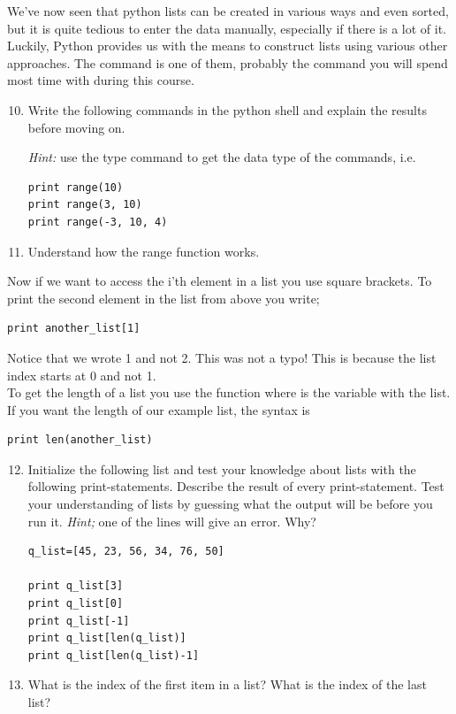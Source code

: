 \documentclass{article}
\begin{document}
We've now seen that python lists can be created in various ways and even
sorted, but it is quite tedious to enter the data manually, especially if
there is a lot of it.
Luckily, Python provides us with the means to construct
lists using various other approaches.
The  command is one of them, probably the
command you will spend most time with during this course.

\begin{enumerate}
  \setcounter{enumi}{9}
  \item Write the following commands in the python shell and explain the results
    before moving on.

    {\em Hint:} use the type command to get the data type of the commands,
    i.e. 

\begin{lstlisting}
print range(10)
print range(3, 10)
print range(-3, 10, 4)
\end{lstlisting}

  \item Understand how the range function works.
\end{enumerate}


Now if we want to access the i'th element in a list
you use square brackets. To print the second element
in the list from above you write;

\begin{lstlisting}
print another_list[1]
\end{lstlisting}

Notice that we wrote 1 and not 2. This was not a typo!
This is because the list index starts at 0 and not 1.\\

To get the length of a list you use the function 
where  is the variable with the list.
If you want the length of our example list, the syntax is

\begin{lstlisting}
print len(another_list)
\end{lstlisting}


\begin{enumerate}
  \setcounter{enumi}{11}
  \item Initialize the following list and test your knowledge about
    lists with the following print-statements.
    Describe the result of every print-statement. Test your
    understanding of lists by guessing what the output will be before
    you run it. 
    {\em Hint;} one of the lines will give an error. Why?

\begin{lstlisting}
q_list=[45, 23, 56, 34, 76, 50]

print q_list[3]
print q_list[0]
print q_list[-1]
print q_list[len(q_list)]
print q_list[len(q_list)-1]
\end{lstlisting}

  \item What is the index of the first item in a list? What is the index of
    the last list?

\end{enumerate}
\end{document}
